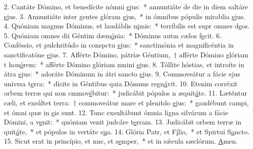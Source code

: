 2. Cantáte Dómino, et benedícite nómni \uline{e}jus:~* annuntiáte de die in diem saltáre \uline{e}jus.
3. Annuntiáte inter gentes glóram \uline{e}jus,~* in ómnibus pópulis mirablia \uline{e}jus.
4. Quóniam magnus Dóminus, et laudáblis n\uline{i}mis:~* terríbilis est supr omnes d\uline{e}os.
5. Quóniam omnes dii Géntim dæm\uline{ó}nia:~* Dóminus autm cælos f\uline{e}cit.
6. Conféssio, et pulchritúdo in conspctu \uline{e}jus:~* sanctimónia et magnificéntia in sanctificatóne \uline{e}jus.
7. Afférte Dómino, pátriæ Géntium,~† afférte Dómino glóriam t hon\uline{ó}rem:~* afférte Dómino glóriam nmini \uline{e}jus.
8. Tóllite hóstias, et introíte in átra \uline{e}jus:~* adoráte Dóminum in átri sancto \uline{e}jus.
9. Commoveátur a fácie ejus univrsa t\uline{e}rra:~* dícite in Géntibus quia Dómnus regn\uline{á}vit.
10. Etenim corréxit orbem terræ qui non cmmov\uline{é}bitur:~* judicábit pópulos n æquit\uline{á}te.
11. Læténtur cæli, et exsúltet terra:~† commoveátur mare et plenitdo \uline{e}jus:~* gaudébunt campi, et ómni quæ in \uline{e}is sunt.
12. Tunc exsultábunt ómnia ligna silvárum a fácie Dómini, a v\uline{e}nit:~* quóniam venit judcáre t\uline{e}rram.
13. Judicábit orbem terræ in quit\uline{á}te,~* et pópulos in vertáte s\uline{u}a.
14. Glória Patr, et F\uline{í}lio,~* et Spirtui S\uline{a}ncto.
15. Sicut erat in princípio, et nnc, et s\uline{e}mper,~* et in sǽcula sæclórum. \uline{A}men.
